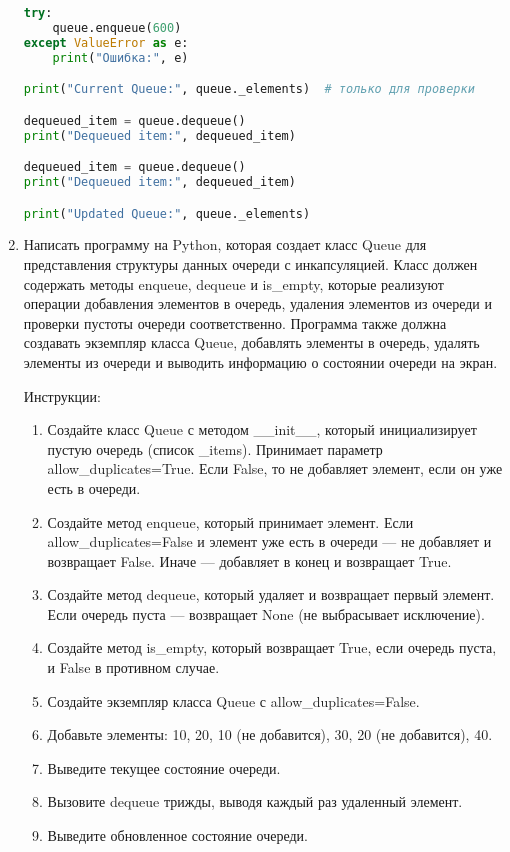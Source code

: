 \begin{enumerate}
\begin{lstlisting}[language=Python]
try:
    queue.enqueue(600)
except ValueError as e:
    print("Ошибка:", e)

print("Current Queue:", queue._elements)  # только для проверки

dequeued_item = queue.dequeue()
print("Dequeued item:", dequeued_item)

dequeued_item = queue.dequeue()
print("Dequeued item:", dequeued_item)

print("Updated Queue:", queue._elements)
\end{lstlisting}

\item Написать программу на Python, которая создает класс Queue для представления структуры данных очереди с инкапсуляцией. Класс должен содержать методы enqueue, dequeue и is\_empty, которые реализуют операции добавления элементов в очередь, удаления элементов из очереди и проверки пустоты очереди соответственно. Программа также должна создавать экземпляр класса Queue, добавлять элементы в очередь, удалять элементы из очереди и выводить информацию о состоянии очереди на экран.

Инструкции:
\begin{enumerate}
    \item Создайте класс Queue с методом \_\_init\_\_, который инициализирует пустую очередь (список \_items). Принимает параметр allow\_duplicates=True. Если False, то не добавляет элемент, если он уже есть в очереди.
    \item Создайте метод enqueue, который принимает элемент. Если allow\_duplicates=False и элемент уже есть в очереди — не добавляет и возвращает False. Иначе — добавляет в конец и возвращает True.
    \item Создайте метод dequeue, который удаляет и возвращает первый элемент. Если очередь пуста — возвращает None (не выбрасывает исключение).
    \item Создайте метод is\_empty, который возвращает True, если очередь пуста, и False в противном случае.
    \item Создайте экземпляр класса Queue с allow\_duplicates=False.
    \item Добавьте элементы: 10, 20, 10 (не добавится), 30, 20 (не добавится), 40.
    \item Выведите текущее состояние очереди.
    \item Вызовите dequeue трижды, выводя каждый раз удаленный элемент.
    \item Выведите обновленное состояние очереди.
\end{enumerate}


\end{enumerate}
